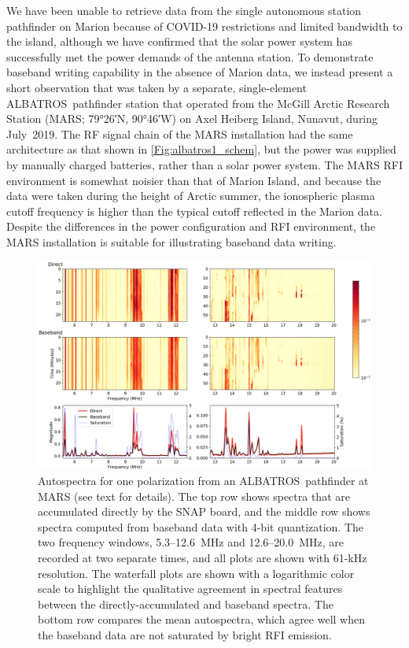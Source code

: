 \documentclass{ws-jai}
\def\albatros{ALBATROS}
\begin{document}
We have been unable to retrieve data from the single autonomous
station pathfinder on Marion because of COVID-19 restrictions and
limited bandwidth to the island, although we have confirmed that the
solar power system has successfully met the power demands of the
antenna station.  To demonstrate baseband writing capability in the
absence of Marion data, we instead present a short observation that
was taken by a separate, single-element \albatros\ pathfinder station
that operated from the McGill Arctic Research Station (MARS;
\ang{79;26;}N, \ang{90;46;}W) on Axel Heiberg Island, Nunavut, during
July~2019.  The RF signal chain of the MARS installation had the same
architecture as that shown in \autoref{Fig:albatros1_schem}, but the
power was supplied by manually charged batteries, rather than a solar
power system.  The MARS RFI environment is somewhat noisier than that
of Marion Island, and because the data were taken during the height of
Arctic summer, the ionospheric plasma cutoff frequency is higher than
the typical cutoff reflected in the Marion data.  Despite the
differences in the power configuration and RFI environment, the MARS
installation is suitable for illustrating baseband data writing.

\begin{figure}[t]
  \begin{center}
    \includegraphics[width=\linewidth]{Figures/baseband_direct_auto_compare.png}
    \caption{Autospectra for one polarization from an
      \albatros\ pathfinder at MARS (see text for details).  The top
      row shows spectra that are accumulated directly by the SNAP
      board, and the middle row shows spectra computed from baseband
      data with 4-bit quantization.  The two frequency windows,
      5.3--12.6~MHz and 12.6--20.0~MHz, are recorded at two separate
      times, and all plots are shown with 61-kHz resolution.  The
      waterfall plots are shown with a logarithmic color scale to
      highlight the qualitative agreement in spectral features between
      the directly-accumulated and baseband spectra.  The bottom row
      compares the mean autospectra, which agree well when the
      baseband data are not saturated by bright RFI emission.}
    \label{Fig:baseband_direct_auto}
  \end{center}
\end{figure}
\end{document}
